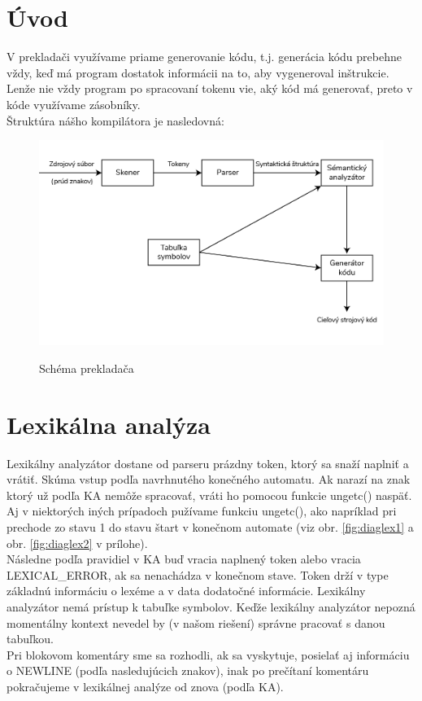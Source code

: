 \documentclass[a4paper,11pt]{article}
\begin{document}
	\tableofcontents
	\thispagestyle{empty}
	\cleardoublepage

	\setcounter{page}{1}

	\section{Úvod}\label{sec:uvod}

		\noindent V prekladači využívame priame generovanie kódu, t.j. generácia kódu prebehne vždy, keď má program dostatok informácii na to, aby vygeneroval inštrukcie. Lenže nie vždy program po spracovaní tokenu vie, aký kód má generovať, preto v kóde využívame zásobníky.\\

		\noindent Štruktúra nášho kompilátora je nasledovná:
		\begin{figure}[h]
			\centering
			\includegraphics[width = 12cm]{Compiler.jpg}\\
			\caption{Schéma prekladača}
			\label{fig:compilator}
		\end{figure}

	\section{Lexikálna analýza}\label{sec:lexi}

		Lexikálny analyzátor dostane od parseru prázdny token, ktorý sa snaží naplniť a vrátiť. Skúma vstup podľa navrhnutého konečného automatu. Ak narazí na znak ktorý už podľa KA nemôže spracovať, vráti ho pomocou funkcie ungetc() naspäť. Aj v niektorých iných prípadoch pužívame funkciu ungetc(), ako napríklad pri prechode zo stavu 1 do stavu štart v konečnom automate (viz obr. \ref{fig:diaglex1} a obr. \ref{fig:diaglex2} v prílohe).\\
		Následne podľa pravidiel v KA buď vracia naplnený token alebo vracia LEXICAL\_ERROR, ak sa nenachádza v konečnom stave. Token drží v type základnú informáciu o lexéme a v data dodatočné informácie. Lexikálny analyzátor nemá prístup k tabuľke symbolov. Keďže lexikálny analyzátor nepozná momentálny kontext nevedel by (v našom riešení) správne pracovať s danou tabuľkou.\\
		Pri blokovom komentáry sme sa rozhodli, ak sa vyskytuje, posielať aj informáciu o NEWLINE (podľa nasledujúcich znakov), inak po prečítaní komentáru pokračujeme v lexikálnej analýze od znova (podľa KA).
\end{document}
